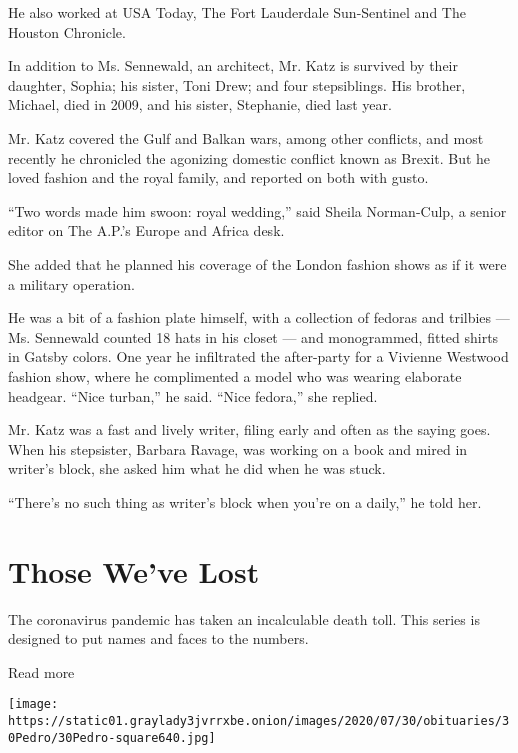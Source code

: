 He also worked at USA Today, The Fort Lauderdale Sun-Sentinel and The
Houston Chronicle.

In addition to Ms. Sennewald, an architect, Mr. Katz is survived by
their daughter, Sophia; his sister, Toni Drew; and four stepsiblings.
His brother, Michael, died in 2009, and his sister, Stephanie, died last
year.

Mr. Katz covered the Gulf and Balkan wars, among other conflicts, and
most recently he chronicled the agonizing domestic conflict known as
Brexit. But he loved fashion and the royal family, and reported on both
with gusto.

``Two words made him swoon: royal wedding,'' said Sheila Norman-Culp, a
senior editor on The A.P.'s Europe and Africa desk.

She added that he planned his coverage of the London fashion shows as if
it were a military operation.

He was a bit of a fashion plate himself, with a collection of fedoras
and trilbies --- Ms. Sennewald counted 18 hats in his closet --- and
monogrammed, fitted shirts in Gatsby colors. One year he infiltrated the
after-party for a Vivienne Westwood fashion show, where he complimented
a model who was wearing elaborate headgear. ``Nice turban,'' he said.
``Nice fedora,'' she replied.

Mr. Katz was a fast and lively writer, filing early and often as the
saying goes. When his stepsister, Barbara Ravage, was working on a book
and mired in writer's block, she asked him what he did when he was
stuck.

``There's no such thing as writer's block when you're on a daily,'' he
told her.

\href{https://www.nytimes3xbfgragh.onion/interactive/2020/obituaries/people-died-coronavirus-obituaries.html?action=click\&pgtype=Article\&state=default\&region=BELOW_MAIN_CONTENT\&context=covid_obits_promo}{}

\hypertarget{those-weve-lost}{%
\section{Those We've Lost}\label{those-weve-lost}}

The coronavirus pandemic has taken an incalculable death toll. This
series is designed to put names and faces to the numbers.

Read more

\texttt{[image: https://static01.graylady3jvrrxbe.onion/images/2020/07/30/obituaries/30Pedro/30Pedro-square640.jpg]}

